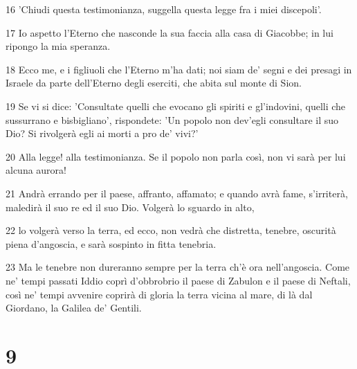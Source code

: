 \par 16 'Chiudi questa testimonianza, suggella questa legge fra i miei discepoli'.
\par 17 Io aspetto l'Eterno che nasconde la sua faccia alla casa di Giacobbe; in lui ripongo la mia speranza.
\par 18 Ecco me, e i figliuoli che l'Eterno m'ha dati; noi siam de' segni e dei presagi in Israele da parte dell'Eterno degli eserciti, che abita sul monte di Sion.
\par 19 Se vi si dice: 'Consultate quelli che evocano gli spiriti e gl'indovini, quelli che sussurrano e bisbigliano', rispondete: 'Un popolo non dev'egli consultare il suo Dio? Si rivolgerà egli ai morti a pro de' vivi?'
\par 20 Alla legge! alla testimonianza. Se il popolo non parla così, non vi sarà per lui alcuna aurora!
\par 21 Andrà errando per il paese, affranto, affamato; e quando avrà fame, s'irriterà, maledirà il suo re ed il suo Dio. Volgerà lo sguardo in alto,
\par 22 lo volgerà verso la terra, ed ecco, non vedrà che distretta, tenebre, oscurità piena d'angoscia, e sarà sospinto in fitta tenebria.
\par 23 Ma le tenebre non dureranno sempre per la terra ch'è ora nell'angoscia. Come ne' tempi passati Iddio coprì d'obbrobrio il paese di Zabulon e il paese di Neftali, così ne' tempi avvenire coprirà di gloria la terra vicina al mare, di là dal Giordano, la Galilea de' Gentili.

\chapter{9}

